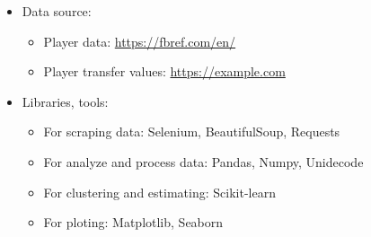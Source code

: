 \documentclass[a4paper,12pt]{article}
\begin{document}
\begin{itemize}[leftmargin= 1cm]
    \item Data source:
        \begin{itemize}[label={}, leftmargin= 1cm]
            \item Player data: \url{https://fbref.com/en/}
            \item Player transfer values: \url{https://example.com}
        \end{itemize}
    \item Libraries, tools:
        \begin{itemize}[label= {}, leftmargin= 1cm]
            \item For scraping data: Selenium, BeautifulSoup, Requests
            \item For analyze and process data: Pandas, Numpy, Unidecode
            \item For clustering and estimating: Scikit-learn
            \item For ploting: Matplotlib, Seaborn
        \end{itemize}
\end{itemize}

\newpage
\end{document}

